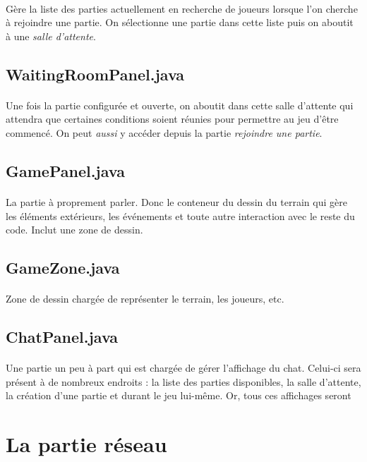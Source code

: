 \documentclass[a4paper,12pt]{report}
\begin{document}
\paragraph{}
Gère la liste des parties actuellement en recherche de joueurs lorsque l'on cherche à rejoindre une partie. On sélectionne une partie dans cette liste puis on aboutit à une \emph{salle d'attente}.
\subsection{WaitingRoomPanel.java}
\paragraph{}
Une fois la partie configurée et ouverte, on aboutit dans cette salle d'attente qui attendra que certaines conditions soient réunies pour permettre au jeu d'être commencé. On peut \emph{aussi} y accéder depuis la partie \emph{rejoindre une partie}.
\subsection{GamePanel.java}
\paragraph{}
La partie à proprement parler. Donc le conteneur du dessin du terrain qui gère les éléments extérieurs, les événements et toute autre interaction avec le reste du code. Inclut une zone de dessin.
\subsection{GameZone.java}
\paragraph{}
Zone de dessin chargée de représenter le terrain, les joueurs, etc.
\subsection{ChatPanel.java}
\paragraph{}
Une partie un peu à part qui est chargée de gérer l'affichage du chat. Celui-ci sera présent à de nombreux endroits : la liste des parties disponibles, la salle d'attente, la création d'une partie et durant le jeu lui-même. Or, tous ces affichages seront
\section{La partie réseau}
\end{document}
